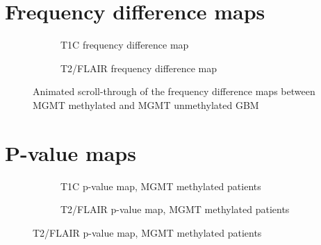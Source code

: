 \begin{subappendices}
    \section{Frequency difference maps}
    \begin{figure}[H]
    \centering
    \begin{subfigure}[t]{0.4\textwidth}
        \centering
        \caption{\gls{T1C} frequency difference map}\label{fig:HGG_loc_T1_freq_dif_gif}
    \end{subfigure}
    \hfill
    \begin{subfigure}[t]{0.4\textwidth}
        \centering
        \caption{\gls{T2}/\gls{FLAIR} frequency difference map}\label{fig:HGG_loc_T2_freq_dif_gif}
    \end{subfigure}
    \caption{Animated scroll-through of the frequency difference maps between \gls{MGMT} methylated and \gls{MGMT} unmethylated \gls{GBM}}\label{fig:HGG_loc_freq_map_full}
    \end{figure}


    \newpage
    \section{P-value maps}
    \begin{figure}[H]
        \centering
        \begin{subfigure}[t]{0.4\textwidth}
            \centering
            \caption{\acrshort{T1C} p-value map, \acrshort{MGMT} methylated patients}\label{fig:HGG_loc_T1_p_value_map_methylated}
        \end{subfigure}
        \hfill
        \begin{subfigure}[t]{0.4\textwidth}
            \centering
            \caption{\acrshort{T2}/\acrshort{FLAIR} p-value map, \acrshort{MGMT} methylated patients}\label{fig:HGG_loc_T2_p_value_map_methylated}
        \end{subfigure}


\end{figure}
\end{subappendices}
